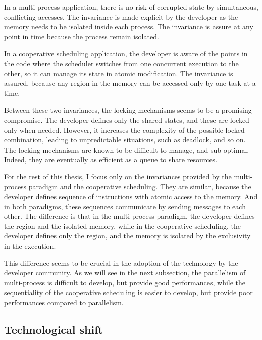 In a multi-process application, there is no risk of corrupted state by simultaneous, conflicting accesses.
The invariance is made explicit by the developer as the memory needs to be isolated inside each process.
The invariance is assure at any point in time because the process remain isolated.

In a cooperative scheduling application, the developer is aware of the points in the code where the scheduler switches from one concurrent execution to the other, so it can manage its state in atomic modification.
The invariance is assured, because any region in the memory can be accessed only by one task at a time.

Between these two invariances, the locking mechanisms seems to be a promising compromise.
The developer defines only the shared states, and these are locked only when needed.
However, it increases the complexity of the possible locked combination, leading to unpredictable situations, such as deadlock, and so on.
The locking mechanisms are known to be difficult to manage, and sub-optimal.
Indeed, they are eventually as efficient as a queue to share resources.

For the rest of this thesis, I focus only on the invariances provided by the multi-process paradigm and the cooperative scheduling.
They are similar, because the developer defines sequence of instructions with atomic access to the memory.
And in both paradigms, these sequences communicate by sending messages to each other.
The difference is that in the multi-process paradigm, the developer defines the region and the isolated memory, while in the cooperative scheduling, the developer defines only the region, and the memory is isolated by the exclusivity in the execution.

This difference seems to be crucial in the adoption of the technology by the developer community.
As we will see in the next subsection, the parallelism of multi-process is difficult to develop, but provide good performances, while the sequentiality of the cooperative scheduling is easier to develop, but provide poor performances compared to parallelism.



\subsection{Technological shift}


